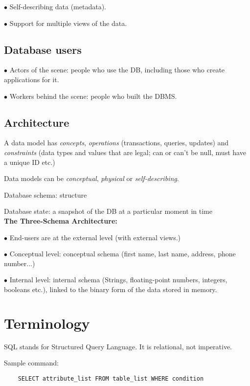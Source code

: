 \documentclass[english,openany]{book}
\begin{document}
    $\bullet$ Self-describing data (metadata).

    $\bullet$ Support for multiple views of the data.

    \subsection{Database users}

    $\bullet$ Actors of the scene: people who use the DB, including those who create applications for it.

    $\bullet$ Workers behind the scene: people who built the DBMS.

    \subsection{Architecture}

    A data model has \textit{concepts}, \textit{operations} (transactions, queries, updates) and \textit{constraints} (data types and values that are legal; can or can't be null, must have a unique ID etc.)

    Data models can be \textit{conceptual}, \textit{physical} or \textit{self-describing}.

    Database schema: structure

    Database state: a snapshot of the DB at a particular moment in time\\

    \textbf{The Three-Schema Architecture: }

    $\bullet$ End-users are at the external level (with external views.)

    $\bullet$ Conceptual level: conceptual schema  (first name, last name, address, phone number...)

    $\bullet$ Internal level: internal schema (Strings, floating-point numbers, integers, booleans etc.), linked to the binary form of the data stored in memory.

    \section{Terminology}

    SQL stands for Structured Query Language. It is relational, not imperative.

    Sample command:

    \begin{lstlisting}
    SELECT attribute_list FROM table_list WHERE condition
    \end{lstlisting}
\end{document}
